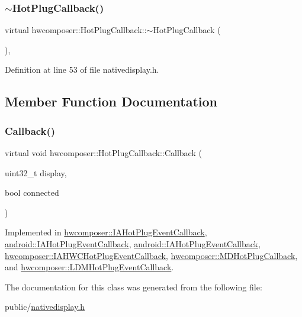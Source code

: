 \subsubsection{\texorpdfstring{$\sim$\+Hot\+Plug\+Callback()}{~HotPlugCallback()}}
{\footnotesize\ttfamily virtual hwcomposer\+::\+Hot\+Plug\+Callback\+::$\sim$\+Hot\+Plug\+Callback (\begin{DoxyParamCaption}{ }\end{DoxyParamCaption})\hspace{0.3cm}{\ttfamily [inline]}, {\ttfamily [virtual]}}



Definition at line 53 of file nativedisplay.\+h.


\begin{DoxyCode}{0}
\end{DoxyCode}


\subsection{Member Function Documentation}
\mbox{\label{classhwcomposer_1_1HotPlugCallback_a455c8913e1da9b165134a05c9cb441ba}} 
\subsubsection{\texorpdfstring{Callback()}{Callback()}}
{\footnotesize\ttfamily virtual void hwcomposer\+::\+Hot\+Plug\+Callback\+::\+Callback (\begin{DoxyParamCaption}\item[{uint32\+\_\+t}]{display,  }\item[{bool}]{connected }\end{DoxyParamCaption})\hspace{0.3cm}{\ttfamily [pure virtual]}}



Implemented in \mbox{\hyperlink{classhwcomposer_1_1IAHotPlugEventCallback_a77b86b9fb88073abf1cab0b5aed4be1d}{hwcomposer\+::\+I\+A\+Hot\+Plug\+Event\+Callback}}, \mbox{\hyperlink{classandroid_1_1IAHotPlugEventCallback_af5cbfe8fc04fa828f75153f2b5f548b8}{android\+::\+I\+A\+Hot\+Plug\+Event\+Callback}}, \mbox{\hyperlink{classandroid_1_1IAHotPlugEventCallback_a8808ed272ecfd7006c28f0e54d6ba9e4}{android\+::\+I\+A\+Hot\+Plug\+Event\+Callback}}, \mbox{\hyperlink{classhwcomposer_1_1IAHWCHotPlugEventCallback_a06b3866efbc8e72c992e71357de1b4cb}{hwcomposer\+::\+I\+A\+H\+W\+C\+Hot\+Plug\+Event\+Callback}}, \mbox{\hyperlink{classhwcomposer_1_1MDHotPlugCallback_a56a4bfc5b98f35a0c27aa97afb119a7a}{hwcomposer\+::\+M\+D\+Hot\+Plug\+Callback}}, and \mbox{\hyperlink{classhwcomposer_1_1LDMHotPlugEventCallback_ab5e17c96c17c3707c3ef98d856807822}{hwcomposer\+::\+L\+D\+M\+Hot\+Plug\+Event\+Callback}}.



The documentation for this class was generated from the following file\+:\begin{DoxyCompactItemize}
\item 
public/\mbox{\hyperlink{nativedisplay_8h}{nativedisplay.\+h}}\end{DoxyCompactItemize}
